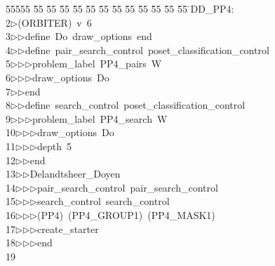 %
%
\begin{tabbing}
55555 \= 55 \= 55 \= 55 \= 55 \= 55 \= 55 \= 55 \= 55 \= 55 \= 55 \= 55 \= 55 \= \>DD\_PP4:\\[0pt]
2\>$\triangleright$\>(ORBITER)\ v\ 6\ \\[0pt]
3\>$\triangleright$\>$\triangleright$\>define\ Do\ draw\_options\ end\ \\[0pt]
4\>$\triangleright$\>$\triangleright$\>define\ pair\_search\_control\ poset\_classification\_control\ \\[0pt]
5\>$\triangleright$\>$\triangleright$\>$\triangleright$\>problem\_label\ PP4\_pairs\ W\ \\[0pt]
6\>$\triangleright$\>$\triangleright$\>$\triangleright$\>draw\_options\ Do\ \\[0pt]
7\>$\triangleright$\>$\triangleright$\>end\ \\[0pt]
8\>$\triangleright$\>$\triangleright$\>define\ search\_control\ poset\_classification\_control\ \\[0pt]
9\>$\triangleright$\>$\triangleright$\>$\triangleright$\>problem\_label\ PP4\_search\ W\ \\[0pt]
10\>$\triangleright$\>$\triangleright$\>$\triangleright$\>draw\_options\ Do\ \\[0pt]
11\>$\triangleright$\>$\triangleright$\>$\triangleright$\>depth\ 5\ \\[0pt]
12\>$\triangleright$\>$\triangleright$\>end\ \\[0pt]
13\>$\triangleright$\>$\triangleright$\>Delandtsheer\_Doyen\ \\[0pt]
14\>$\triangleright$\>$\triangleright$\>$\triangleright$\>pair\_search\_control\ pair\_search\_control\ \\[0pt]
15\>$\triangleright$\>$\triangleright$\>$\triangleright$\>search\_control\ search\_control\ \\[0pt]
16\>$\triangleright$\>$\triangleright$\>$\triangleright$\>(PP4)\ (PP4\_GROUP1)\ (PP4\_MASK1)\ \\[0pt]
17\>$\triangleright$\>$\triangleright$\>$\triangleright$\>create\_starter\ \\[0pt]
18\>$\triangleright$\>$\triangleright$\>$\triangleright$\>end\ \\[0pt]
19\>\end{tabbing}
